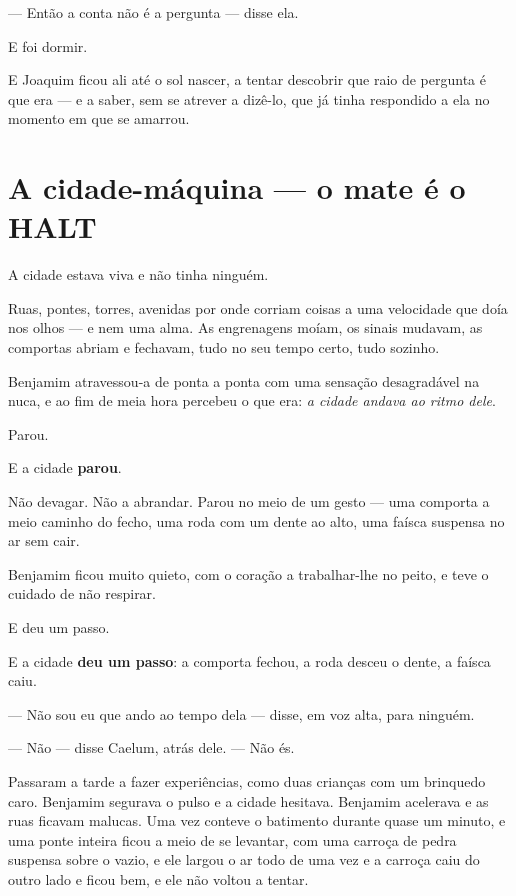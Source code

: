 \documentclass[livro.tex]{subfiles}
\begin{document}
--- Então a conta não é a pergunta --- disse ela.

E foi dormir.

E Joaquim ficou ali até o sol nascer, a tentar descobrir que raio de pergunta é que era --- e a saber, sem se
atrever a dizê-lo, que já tinha respondido a ela no momento em que se amarrou.


\chapter{A cidade-máquina --- o mate é o HALT}

A cidade estava viva e não tinha ninguém.

Ruas, pontes, torres, avenidas por onde corriam coisas a uma velocidade que doía nos olhos --- e nem uma alma. As
engrenagens moíam, os sinais mudavam, as comportas abriam e fechavam, tudo no seu tempo certo, tudo sozinho.

Benjamim atravessou-a de ponta a ponta com uma sensação desagradável na nuca, e ao fim de meia hora percebeu o que
era: \emph{a cidade andava ao ritmo dele}.

\medskip

Parou.

E a cidade \textbf{parou}.

\medskip

Não devagar. Não a abrandar. Parou no meio de um gesto --- uma comporta a meio caminho do fecho, uma roda com um
dente ao alto, uma faísca suspensa no ar sem cair.

Benjamim ficou muito quieto, com o coração a trabalhar-lhe no peito, e teve o cuidado de não respirar.

E deu um passo.

E a cidade \textbf{deu um passo}: a comporta fechou, a roda desceu o dente, a faísca caiu.

\medskip

--- Não sou eu que ando ao tempo dela --- disse, em voz alta, para ninguém.

--- Não --- disse Caelum, atrás dele. --- Não és.

\medskip

Passaram a tarde a fazer experiências, como duas crianças com um brinquedo caro. Benjamim segurava o pulso e a
cidade hesitava. Benjamim acelerava e as ruas ficavam malucas. Uma vez conteve o batimento durante quase um minuto,
e uma ponte inteira ficou a meio de se levantar, com uma carroça de pedra suspensa sobre o vazio, e ele largou o ar
todo de uma vez e a carroça caiu do outro lado e ficou bem, e ele não voltou a tentar.
\end{document}
